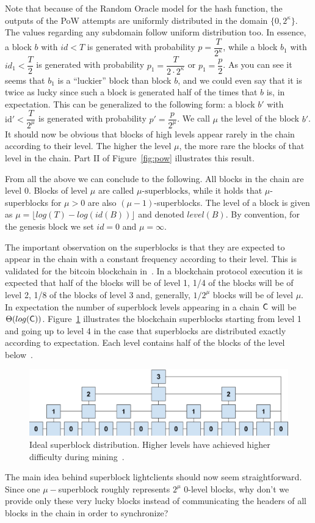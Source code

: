 Note that because of the Random Oracle model for the hash function, the outputs of the PoW attempts are uniformly distributed in the domain $\{0, 2^{\kappa} \}$.
The values regarding any subdomain follow uniform distribution too.
In essence, a block $b$ with $id < T$ is generated with probability $p = \dfrac{T}{2^\kappa}$, while a block $b_1$ with $id_1 < \dfrac{T}{2}$ is generated with probability $p_1 = \dfrac{T}{2 \cdot 2^\kappa} $ or $p_1 = \dfrac{p}{2}$. As you can see it seems that $b_1$ is a ``luckier'' block than block $b$, and we could even say that it is twice as lucky since such a block is generated half of the times that $b$ is, in expectation. This can be generalized to the following form: a block $b'$ with $\text{id}' < \dfrac{T}{2^\mu}$ is generated with probability $p' = \dfrac{p}{2^\mu}$. We call $\mu$ the level of the block $b'$.
It should now be obvious that blocks of high levels appear rarely in the chain according to their level. The higher the level $\mu$, the more rare the blocks of that level in the chain. Part II of Figure~\ref{fig:pow} illustrates this result.

From all the above we can conclude to the following. All blocks in the chain are level 0. Blocks of level $\mu$ are called $\mu\text{-superblocks}$, while it holds that $\mu$-superblocks for $\mu > 0$ are also $(\mu -1)$-superblocks. The level of a block is given as $\mu = \lfloor log(T) - log(id(B)) \rfloor$ and denoted $level(B)$. By convention, for the genesis block we set $id = 0$ and $\mu = \infty$.

The important observation on the superblocks is that they are expected to appear in the chain with a constant frequency according to their level. This is validated for the bitcoin blockchain in~\cite{compactsuperblocks}. In a blockchain protocol execution it is expected that half of the blocks will be of level 1, 1/4 of the blocks will be of level 2, 1/8 of the blocks of level 3 and, generally, $1 / 2^\mu$ blocks will be of level $\mu$. In expectation the number of superblock levels appearing in a chain $\mathsf{C}$ will be $\Theta(log(\mathsf{C}))$. Figure~\ref{fig:superblock_distribution} illustrates the blockchain superblocks starting from level 1 and going up to level 4 in the case that superblocks are distributed exactly according to expectation. Each level contains half of the blocks of the level below~\cite{nipopows}.

\begin{figure}[h!]
	\begin{center}
		\includegraphics[width=0.8\columnwidth]{figures/superblock-distribution.pdf}
	\end{center}
	\caption{Ideal superblock distribution. Higher levels have achieved higher difficulty during mining~\cite{nipopows}.}
	\label{fig:superblock_distribution}
\end{figure}

The main idea behind superblock lightclients should now seem straightforward. Since one $\mu-$superblock roughly represents $2^\mu$ 0-level blocks, why don't we provide only these very lucky blocks instead of communicating the headers of all blocks in the chain in order to synchronize?